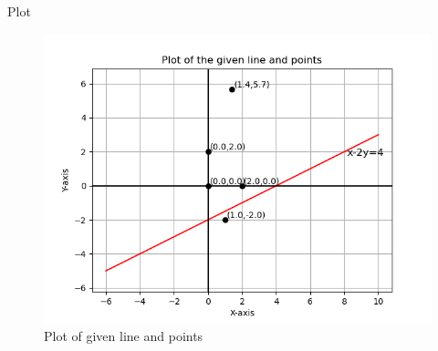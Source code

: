 \documentclass{beamer}
\begin{document}
\begin{frame}{Plot}
    \begin{figure}
        \centering
        \includegraphics[width=0.5\columnwidth]{../figs/plot.png}
        \caption{Plot of given line and points}
        \label{fig:fig}
    \end{figure}
\end{frame}
\end{document}
